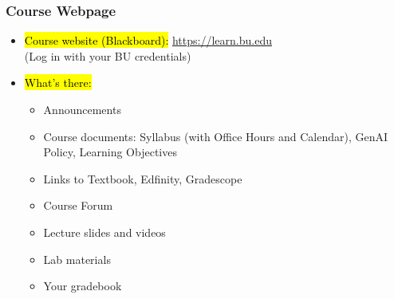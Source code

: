 \documentclass[slidestop,compress,mathserif]{beamer}
\begin{document}
\begin{frame}
	\frametitle{Course Webpage} 
	\begin{itemize}
		\item \hl{Course website (Blackboard):} \url{https://learn.bu.edu} \\
		(Log in with your BU credentials)
		\item \hl{What's there:}
		\begin{itemize}
			\item Announcements
			\item Course documents: Syllabus (with Office Hours and Calendar), GenAI Policy, Learning Objectives
			\item Links to Textbook, Edfinity, Gradescope
			\item Course Forum
			\item Lecture slides and videos
			\item Lab materials
			\item Your gradebook
		\end{itemize}
	\end{itemize}	
\end{frame}

\end{document}
